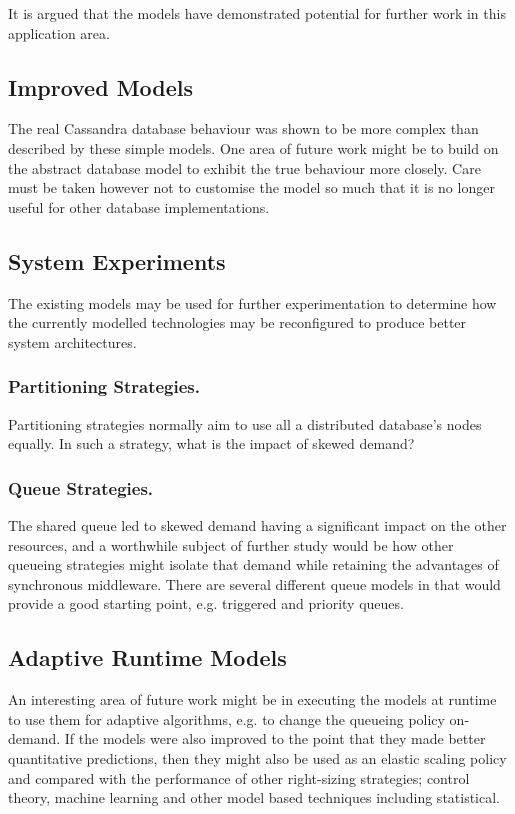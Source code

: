 It is argued that the models have demonstrated potential for further work in this application area.
	
\subsection{Improved Models}

The real Cassandra database behaviour was shown to be more complex than described by these simple models.  One area of future work might be to build on the abstract database model to exhibit the true behaviour more closely.  Care must be taken however not to customise the model so much that it is no longer useful for other database implementations.

\subsection{System Experiments}

The existing models may be used for further experimentation to determine how the currently modelled technologies may be reconfigured to produce better system architectures.

\subsubsection{Partitioning Strategies.}  Partitioning strategies normally aim to use all a distributed database's nodes equally.  In such a strategy, what is the impact of skewed demand?

\subsubsection{Queue Strategies.}  The shared queue led to skewed demand having a significant impact on the other resources, and a worthwhile subject of further study would be how other queueing strategies might isolate that demand while retaining the advantages of synchronous middleware.  There are several different queue models in \cite{RN75} that would provide a good starting point, e.g. triggered and priority queues.

\subsection{Adaptive Runtime Models}
An interesting area of future work might be in executing the models at runtime to use them for adaptive algorithms, e.g. to change the queueing policy on-demand.  If the models were also improved to the point that they made better quantitative predictions, then they might also be used as an elastic scaling policy and compared with the performance of other right-sizing strategies; control theory, machine learning and other model based techniques including statistical.

